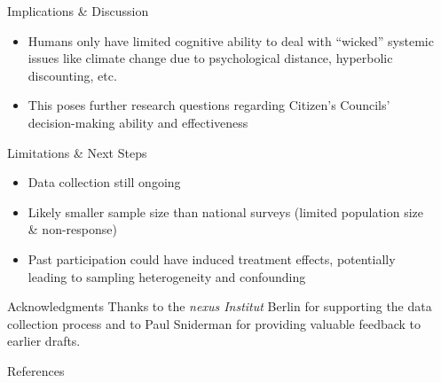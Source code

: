 \documentclass[final]{beamer}
\newlength{\sepwidth}
\newlength{\colwidth}
\newcommand{\separatorcolumn}{\begin{column}{\sepwidth}\end{column}}
\begin{document}
\begin{frame}[t]
\begin{columns}[t]
\begin{column}{\colwidth}
\begin{alertblock}{Implications \& Discussion}
    \vspace{-0.5ex}
    \begin{itemize}
        \item Humans only have limited cognitive ability to deal with ``wicked'' systemic issues like climate change due to psychological distance, hyperbolic discounting, etc. \citep{schweizer2022SocialPerception}
        \vspace{0.5ex}
        \item This poses further research questions regarding Citizen's Councils' decision-making ability and effectiveness
    \end{itemize}
    
      
    \end{alertblock}
    \begin{block}{Limitations \& Next Steps}

    \begin{itemize}
        \item Data collection still ongoing 
        \item Likely smaller sample size than national surveys (limited population size \& non-response)
        \item Past participation could have induced treatment effects, potentially leading to sampling heterogeneity and confounding
    \end{itemize}
    \end{block}

    \vspace{-12mm}
    \begin{block}{Acknowledgments}
    Thanks to the \textit{nexus Institut} Berlin for supporting the data collection process and to Paul Sniderman for providing valuable feedback to earlier drafts. 
    
    \vspace{-12mm}
    \end{block}


    \begin{block}{References}
    \vspace{-3mm}
    \footnotesize
    \begin{flushleft}
        
    \end{flushleft}
    \end{block}
    
\end{column}

\separatorcolumn
\end{columns}
\end{frame}
\end{document}
